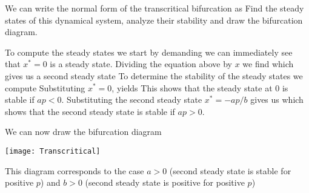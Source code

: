 We can write the normal form of the transcritical bifurcation as 
Find the steady states of this dynamical system, analyze their stability and draw the bifurcation diagram. 

\solution
To compute the steady states we start by demanding
we can immediately see that $x^*=0$ is a steady state. Dividing the equation above by $x$ we find 
which gives us a second steady state
To determine the stability of the steady states we compute
Substituting $x^*=0$, yields
This shows that the steady state at 0 is stable if $ap<0$. Substituting the second steady state $x^*=-ap/b$ gives us
which shows that the second steady state is stable if $ap>0$. 

We can now draw the bifurcation diagram 
\begin{center}
\texttt{[image: Transcritical]}
\end{center}
This diagram corresponds to the case $a>0$ (second steady state is stable for positive $p$) and $b>0$ (second steady state is positive for positive $p$)